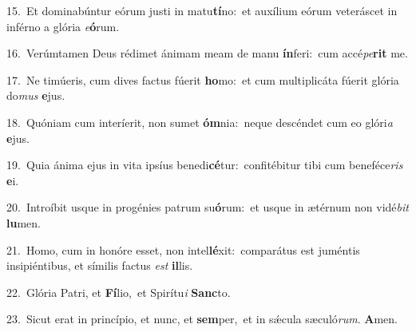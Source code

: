 {\numbfont\textcolor{\numbcolor}{15.}}~Et dominabúntur eórum justi in matu\-\textbf{tí}\-no:~\star et auxílium eórum veteráscet in inférno a glória \textit{e}\-\textbf{ó}rum.\par
{\numbfont\textcolor{\numbcolor}{16.}}~Verúmtamen Deus rédimet ánimam meam de manu \textbf{ín}\-feri:~\star cum accé\-\textit{pe}\-\textbf{rit} me.\par
{\numbfont\textcolor{\numbcolor}{17.}}~Ne timúeris, cum dives factus fúerit \textbf{ho}\-mo:~\star et cum multiplicáta fúerit glória do\textit{mus} \textbf{e}\-jus.\par
{\numbfont\textcolor{\numbcolor}{18.}}~Quóniam cum interíerit, non sumet \textbf{óm}\-nia:~\star neque descéndet cum eo glóri\textit{a} \textbf{e}\-jus.\par
{\numbfont\textcolor{\numbcolor}{19.}}~Quia ánima ejus in vita ipsíus benedi\-\textbf{cé}\-tur:~\star confitébitur tibi cum beneféce\textit{ris} \textbf{e}\-i.\par
{\numbfont\textcolor{\numbcolor}{20.}}~Introíbit usque in progénies patrum su\-\textbf{ó}\-rum:~\star et usque in ætérnum non vidé\textit{bit} \textbf{lu}\-men.\par
{\numbfont\textcolor{\numbcolor}{21.}}~Homo, cum in honóre esset, non intel\-\textbf{lé}\-xit:~\star comparátus est juméntis insipiéntibus, et símilis factus \textit{est} \textbf{il}\-lis.\par
{\numbfont\textcolor{\numbcolor}{22.}}~Glória Patri, et \textbf{Fí}\-lio,~\star et Spirítu\textit{i} \textbf{Sanc}\-to.\par
{\numbfont\textcolor{\numbcolor}{23.}}~Sicut erat in princípio, et nunc, et \textbf{sem}\-per,~\star et in sǽcula sæculó\-\textit{rum}\-. \textbf{A}\-men.\par
